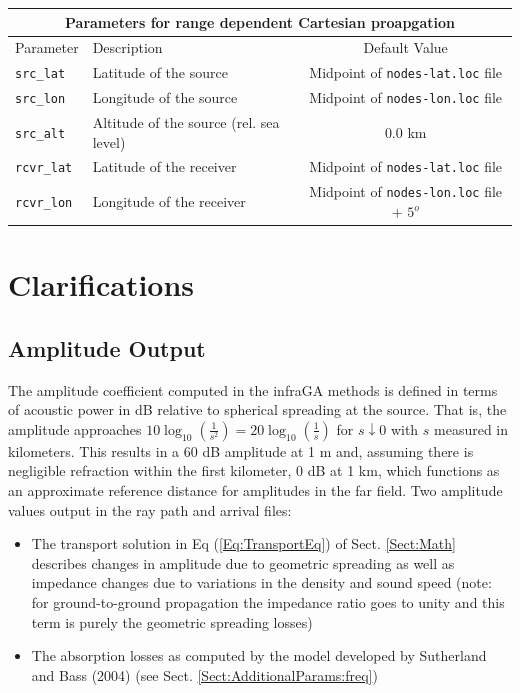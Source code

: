 \documentclass[10pt]{article}
\begin{document}
 \begin{tabular}{ | l | l | c | }
  \hline
  \multicolumn{3}{|c|}{\textbf{Parameters for range dependent Cartesian proapgation}} \\
  \hline
  Parameter & Description & Default Value \\
  \hline \hline
 \verb=src_lat= 			& Latitude of the source 								& Midpoint of \verb=nodes-lat.loc= file \\
 \verb=src_lon= 		& Longitude of the source								& Midpoint of \verb=nodes-lon.loc= file \\
 \verb=src_alt=  		& Altitude of the source (rel. sea level)					& \(0.0\) km \\ \hline
  \verb=rcvr_lat= 		& Latitude of the receiver								& Midpoint of \verb=nodes-lat.loc= file \\
  \verb=rcvr_lon= 		& Longitude of the receiver							& Midpoint of \verb=nodes-lon.loc= file  + \(5^o\) \\ \hline
\end{tabular}
 

\newpage
 \section{Clarifications} 
 \label{Sect:Clarifications}
 \subsection{Amplitude Output}
 \label{Sect:Clarifications:Amplitude}
 
 The amplitude coefficient computed in the infraGA methods is defined in terms of acoustic power in dB relative to spherical spreading at the source.  That is, the amplitude approaches \( 10 \log_{10} \left( \frac{1}{s^2} \right) = 20 \log_{10} \left( \frac{1}{s} \right) \) for \(s\downarrow 0\) with \(s\) measured in kilometers.  This results in a 60 dB amplitude at 1 m and, assuming there is negligible refraction within the first kilometer, 0 dB at 1 km, which functions as an approximate reference distance for amplitudes in the far field.  Two amplitude values output in the ray path and arrival files:
 \begin{itemize}
  \item The transport solution in Eq (\ref{Eq:TransportEq}) of Sect. \ref{Sect:Math} describes changes in amplitude due to geometric spreading as well as impedance changes due to variations in the density and sound speed (note: for ground-to-ground propagation the impedance ratio goes to unity and this term is purely the geometric spreading losses)
  \item The absorption losses as computed by the model developed by Sutherland and Bass (2004) (see Sect. \ref{Sect:AdditionalParams:freq})
\end{itemize} 
\end{document}
